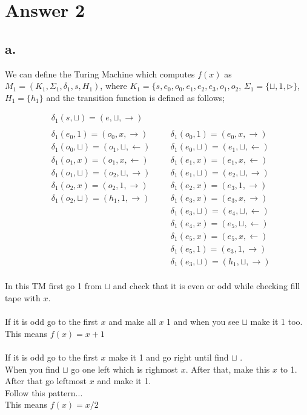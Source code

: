 \documentclass[12pt]{article}
\begin{document}
\section*{Answer 2}

\subsection*{a.}
We can define the Turing Machine which computes $f(x)$ as $M_1 = (K_1,\Sigma_1,\delta_1, s, H_1)$, where
$K_1 = \{s,e_0,o_0,e_1,e_2,e_3,o_1,o_2$, $\Sigma_1 = \{\sqcup,1,\triangleright\}$, $H_1 = \{h_1\}
$ and the transition function is defined as follows;

\begin{align*}
&\delta_1(s,\sqcup) = (e,\sqcup,\rightarrow) \\\\
&\delta_1(e_0,1) = (o_0,x,\rightarrow) && &\delta_1(o_0,1) = (e_0,x,\rightarrow) \\
&\delta_1(o_0,\sqcup) = (o_1,\sqcup,\leftarrow) && &\delta_1(e_0,\sqcup) = (e_1,\sqcup,\leftarrow) \\
&\delta_1(o_1,x) = (o_1,x,\leftarrow) && &\delta_1(e_1,x) = (e_1,x,\leftarrow) \\
&\delta_1(o_1,\sqcup) = (o_2,\sqcup,\rightarrow) && &\delta_1(e_1,\sqcup) = (e_2,\sqcup,\rightarrow)\\
&\delta_1(o_2,x) = (o_2,1,\rightarrow) && &\delta_1(e_2,x) = (e_3,1,\rightarrow) \\
&\delta_1(o_2,\sqcup) = (h_1,1,\rightarrow) && &\delta_1(e_3,x) = (e_3,x,\rightarrow) \\
& &&  &\delta_1(e_3,\sqcup) = (e_4,\sqcup,\leftarrow) \\
& &&  &\delta_1(e_4,x) = (e_5,\sqcup,\leftarrow) \\
& &&  &\delta_1(e_5,x) = (e_5,x,\leftarrow) \\
& &&  &\delta_1(e_5,1) = (e_3,1,\rightarrow) \\
& &&  &\delta_1(e_3,\sqcup) = (h_1,\sqcup,\rightarrow)
\end{align*}
\\
In this TM first go 1 from $\sqcup$ and check that it is even or odd while checking fill tape with $x$. \\\\
If it is odd go to the first $x$ and make all $x$ 1 and when you see $\sqcup$ make it 1 too. \\
This means $f(x) = x + 1$\\\\
If it is odd go to the first $x$ make it 1 and go right until find $\sqcup$ .\\
When you find $\sqcup$ go one left which is righmost $x$.
After that, make this $x$ to 1.\\
After that go leftmost $x$ and make it 1.\\
Follow this pattern...\\
This means $f(x) = x / 2$
\end{document}
